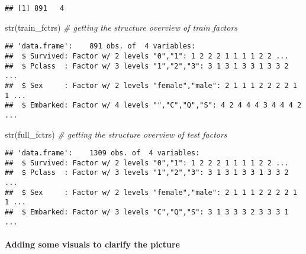 \documentclass[
]{article}
\newenvironment{Shaded}{\begin{snugshade}}{\end{snugshade}}
\newcommand{\CommentTok}[1]{\textcolor[rgb]{0.56,0.35,0.01}{\textit{#1}}}
\newcommand{\FunctionTok}[1]{\textcolor[rgb]{0.00,0.00,0.00}{#1}}
\newcommand{\NormalTok}[1]{#1}
\begin{document}
\begin{verbatim}
## [1] 891   4
\end{verbatim}

\begin{Shaded}
\begin{Highlighting}[]
\FunctionTok{str}\NormalTok{(train\_fctrs)  }\CommentTok{\# getting the structure overview of train factors}
\end{Highlighting}
\end{Shaded}

\begin{verbatim}
## 'data.frame':    891 obs. of  4 variables:
##  $ Survived: Factor w/ 2 levels "0","1": 1 2 2 2 1 1 1 1 2 2 ...
##  $ Pclass  : Factor w/ 3 levels "1","2","3": 3 1 3 1 3 3 1 3 3 2 ...
##  $ Sex     : Factor w/ 2 levels "female","male": 2 1 1 1 2 2 2 2 1 1 ...
##  $ Embarked: Factor w/ 4 levels "","C","Q","S": 4 2 4 4 4 3 4 4 4 2 ...
\end{verbatim}

\begin{Shaded}
\begin{Highlighting}[]
\FunctionTok{str}\NormalTok{(full\_fctrs)   }\CommentTok{\# getting the structure overview of test factors}
\end{Highlighting}
\end{Shaded}

\begin{verbatim}
## 'data.frame':    1309 obs. of  4 variables:
##  $ Survived: Factor w/ 2 levels "0","1": 1 2 2 2 1 1 1 1 2 2 ...
##  $ Pclass  : Factor w/ 3 levels "1","2","3": 3 1 3 1 3 3 1 3 3 2 ...
##  $ Sex     : Factor w/ 2 levels "female","male": 2 1 1 1 2 2 2 2 1 1 ...
##  $ Embarked: Factor w/ 3 levels "C","Q","S": 3 1 3 3 3 2 3 3 3 1 ...
\end{verbatim}

\hypertarget{adding-some-visuals-to-clarify-the-picture}{%
\paragraph{Adding some visuals to clarify the
picture}\label{adding-some-visuals-to-clarify-the-picture}}
\end{document}
